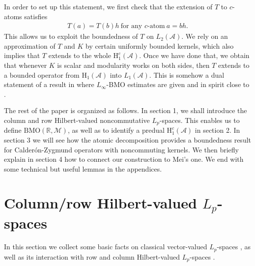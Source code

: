 \documentclass[psamsfonts]{amsart}
\newcommand{\Lp}{L_p}
\newcommand{\Lone}{L_1}
\newcommand{\Ltwo}{L_2}
\newcommand{\Hone}{\mathrm{H}_1}
\newcommand{\Honec}{\mathrm{H}_1^c}
\newcommand{\BMO}{\mathrm{BMO}}
\newcommand{\Hardyc}{\Honec(\mathcal{A})}
\newcommand{\Hardy}{\Hone(\mathcal{A})}
\begin{document}
    In order to set up this statement, we first check that the extension of $T$ to $c$-atoms satisfies
    \begin{align*}
        T(a) = T(b)h \ \textrm{for \ any \ $c$-atom}\  a = bh.
    \end{align*}
    This allows us to exploit the boundedness of $T$ on $\Ltwo(\mathcal{A})$.
    We rely on
    an approximation of $T$ and $K$ by certain  uniformly bounded kernels, which also implies that $T$ extends to the whole $\Hardyc$. Once we have done that, we obtain that whenever $K$ is scalar and modularity works on both sides,  then $T$ extends to a bounded operator from $\Hardy$ into $\Lone(\mathcal{A})$. This is  somehow a dual statement of a result in \cite{JMP14} where $L_\infty$-BMO estimates are given and  in spirit close to \cite{HLMP14}.

    The rest of the paper is organized as follows. In section 1, we
    shall introduce the column and row Hilbert-valued noncommutative
    $\Lp$-spaces. This enables us to define
    $\BMO(\mathbb{R,\mathcal{M}})$, as well as to identify a
    predual $\Hardyc$ in section 2. In section 3 we will see how the
    atomic decomposition provides a boundedness result for
    Calder\'on-Zygmund operators with noncommuting kernels. We then
    briefly explain in section 4 how to connect our construction
    to Mei's one. We end with some technical but useful lemmas in the appendices.

 
    \section{Column/row Hilbert-valued $\Lp$-spaces}




    
  In this section we collect some basic facts on classical vector-valued $L_p$-spaces \cite{HNVW16}, as well as its interaction with row and column Hilbert-valued $L_p$-spaces \cite{JLX06}.
\end{document}

